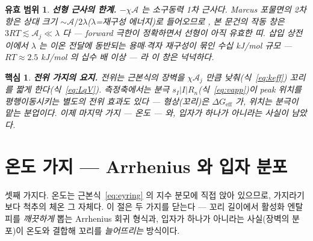 \documentclass[11pt,a4paper]{article}
\newtheorem*{keybox}{핵심}
\newtheorem*{boundbox}{유효 범위}
\newcommand{\eff}{\mathrm{eff}}
\begin{document}
\begin{boundbox}
\textbf{선형 근사의 한계.} $-\chi\mathcal A$ 는 소구동력 1차 근사다. Marcus 포물면의 2차 항은 상대
크기 $\sim\mathcal A/2\lambda$($\lambda$=재구성 에너지)로 들어오므로 \cite{marcus1956}, 본 문건의
작동 창은 $3RT\lesssim\mathcal A_j\ll\lambda$ 다 — forward 극한이 정확하면서 선형이 아직 유효한 띠.
삽입 상전이에서 $\lambda$ 는 이온 전달에 동반되는 용매$\cdot$격자 재구성이 묶인 수십 kJ/mol
규모 — $RT\approx2.5$ kJ/mol 의 십수 배 이상 — 라 이 창은 넉넉하다.
\end{boundbox}

\begin{keybox}
\textbf{전위 가지의 요지.} 전위는 근본식의 장벽을 $\chi\mathcal A_j$ 만큼 낮춰(식~\eqref{eq:keff})
꼬리를 짧게 한다(식~\eqref{eq:LqV}). 측정축에서는 분극 $s_I|I|R_n$(식~\eqref{eq:vapp})이 peak
\emph{위치}를 평행이동시키는 별도의 전위 효과도 있다 — 형상(꼬리)은 $\Delta G_{\eff}$ 가, 위치는 분극이
맡는 분업이다. 이제 마지막 가지 — 온도 — 와, 입자가 하나가 아니라는 사실이 남았다.
\end{keybox}

\section{온도 가지 — Arrhenius 와 입자 분포}\label{sec:tempbranch}
셋째 가지다. 온도는 근본식~\eqref{eq:eyring} 의 지수 분모에 직접 앉아 있으므로, 가지라기보다 척추의 체온
그 자체다. 이 절은 두 가지를 닫는다 — 꼬리 길이에서 활성화 엔탈피를 \emph{깨끗하게} 뽑는 Arrhenius 회귀
형식과, 입자가 하나가 아니라는 사실(장벽의 분포)이 온도와 결합해 꼬리를 \emph{늘어뜨리는} 방식이다.
\end{document}
